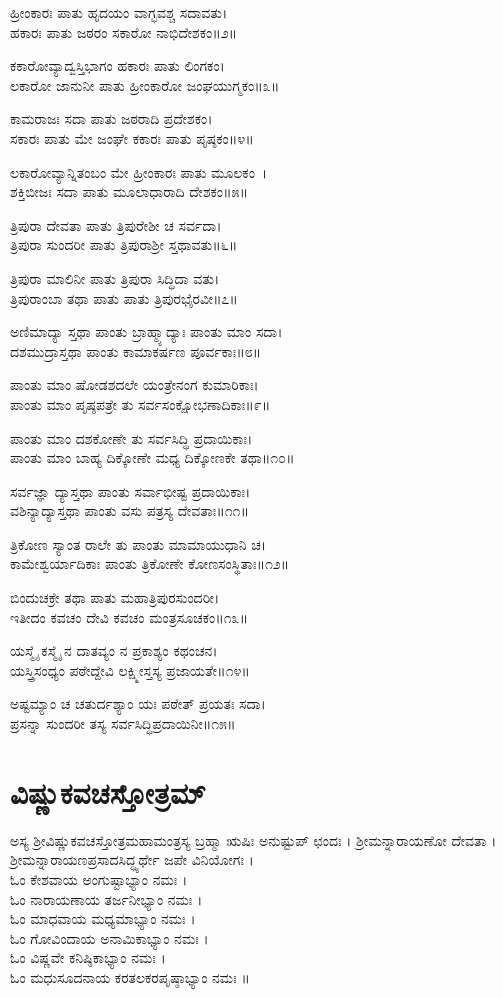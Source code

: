ಹ್ರೀಂಕಾರಃ ಪಾತು ಹೃದಯಂ ವಾಗ್ಭವಶ್ಚ ಸದಾವತು।\\
ಹಕಾರಃ ಪಾತು ಜಠರಂ ಸಕಾರೋ ನಾಭಿದೇಶಕಂ॥೨॥

ಕಕಾರೋವ್ಯಾದ್ವಸ್ತಿಭಾಗಂ ಹಕಾರಃ ಪಾತು ಲಿಂಗಕಂ।\\
ಲಕಾರೋ ಜಾನುನೀ ಪಾತು ಹ್ರೀಂಕಾರೋ ಜಂಘಯುಗ್ಮಕಂ॥೩॥

ಕಾಮರಾಜಃ ಸದಾ ಪಾತು ಜಠರಾದಿ ಪ್ರದೇಶಕಂ।\\
ಸಕಾರಃ ಪಾತು ಮೇ ಜಂಘೇ ಕಕಾರಃ ಪಾತು ಪೃಷ್ಠಕಂ॥೪॥

ಲಕಾರೋವ್ಯಾನ್ನಿತಂಬಂ ಮೇ ಹ್ರೀಂಕಾರಃ ಪಾತು ಮೂಲಕಂ~।\\
ಶಕ್ತಿಬೀಜಃ ಸದಾ ಪಾತು ಮೂಲಾಧಾರಾದಿ ದೇಶಕಂ॥೫॥

ತ್ರಿಪುರಾ ದೇವತಾ ಪಾತು ತ್ರಿಪುರೇಶೀ ಚ ಸರ್ವದಾ।\\
ತ್ರಿಪುರಾ ಸುಂದರೀ ಪಾತು ತ್ರಿಪುರಾಶ್ರೀ ಸ್ತಥಾವತು॥೬॥

ತ್ರಿಪುರಾ ಮಾಲಿನೀ ಪಾತು ತ್ರಿಪುರಾ ಸಿದ್ಧಿದಾ ವತು।\\
ತ್ರಿಪುರಾಂಬಾ ತಥಾ ಪಾತು ಪಾತು ತ್ರಿಪುರಭೈರವೀ॥೭॥

ಅಣಿಮಾದ್ಯಾ ಸ್ತಥಾ ಪಾಂತು ಬ್ರಾಹ್ಮ್ಯಾದ್ಯಾಃ ಪಾಂತು ಮಾಂ ಸದಾ।\\
ದಶಮುದ್ರಾಸ್ತಥಾ ಪಾಂತು ಕಾಮಾಕರ್ಷಣ ಪೂರ್ವಕಾಃ॥೮॥

ಪಾಂತು ಮಾಂ ಷೋಡಶದಲೇ ಯಂತ್ರೇನಂಗ ಕುಮಾರಿಕಾಃ।\\
ಪಾಂತು ಮಾಂ ಪೃಷ್ಠಪತ್ರೇ ತು ಸರ್ವಸಂಕ್ಷೋಭಣಾದಿಕಾಃ॥೯॥

ಪಾಂತು ಮಾಂ ದಶಕೋಣೇ ತು ಸರ್ವಸಿದ್ಧಿ ಪ್ರದಾಯಿಕಾಃ।\\
ಪಾಂತು ಮಾಂ ಬಾಹ್ಯ ದಿಕ್ಕೋಣೇ ಮಧ್ಯ ದಿಕ್ಕೋಣಕೇ ತಥಾ॥೧೦॥

ಸರ್ವಜ್ಞಾ ದ್ಯಾಸ್ತಥಾ ಪಾಂತು ಸರ್ವಾಭೀಷ್ಟ ಪ್ರದಾಯಿಕಾಃ।\\
ವಶಿನ್ಯಾದ್ಯಾಸ್ತಥಾ ಪಾಂತು ವಸು ಪತ್ರಸ್ಯ ದೇವತಾಃ॥೧೧॥

ತ್ರಿಕೋಣ ಸ್ಯಾಂತ ರಾಲೇ ತು ಪಾಂತು ಮಾಮಾಯುಧಾನಿ ಚ।\\
ಕಾಮೇಶ್ವರ್ಯಾದಿಕಾಃ ಪಾಂತು ತ್ರಿಕೋಣೇ ಕೋಣಸಂಸ್ಥಿತಾಃ॥೧೨॥

ಬಿಂದುಚಕ್ರೇ ತಥಾ ಪಾತು ಮಹಾತ್ರಿಪುರಸುಂದರೀ।\\
ಇತೀದಂ ಕವಚಂ ದೇವಿ ಕವಚಂ ಮಂತ್ರಸೂಚಕಂ॥೧೩॥

ಯಸ್ಮೈ ಕಸ್ಮೈ ನ ದಾತವ್ಯಂ ನ ಪ್ರಕಾಶ್ಯಂ ಕಥಂಚನ।\\
ಯಸ್ತ್ರಿಸಂಧ್ಯಂ ಪಠೇದ್ದೇವಿ ಲಕ್ಷ್ಮೀಸ್ತಸ್ಯ ಪ್ರಜಾಯತೇ॥೧೪॥

ಅಷ್ಟಮ್ಯಾಂ ಚ ಚತುರ್ದಶ್ಯಾಂ ಯಃ ಪಠೇತ್ ಪ್ರಯತಃ ಸದಾ।\\
ಪ್ರಸನ್ನಾ ಸುಂದರೀ ತಸ್ಯ ಸರ್ವಸಿದ್ಧಿಪ್ರದಾಯಿನೀ॥೧೫॥
\section{ವಿಷ್ಣುಕವಚಸ್ತೋತ್ರಮ್}
ಅಸ್ಯ ಶ್ರೀವಿಷ್ಣುಕವಚಸ್ತೋತ್ರಮಹಾಮಂತ್ರಸ್ಯ ಬ್ರಹ್ಮಾ ಋಷಿಃ ಅನುಷ್ಟುಪ್ ಛಂದಃ । ಶ್ರೀಮನ್ನಾರಾಯಣೋ ದೇವತಾ । ಶ್ರೀಮನ್ನಾರಾಯಣಪ್ರಸಾದಸಿದ್ಧ್ಯರ್ಥೇ ಜಪೇ ವಿನಿಯೋಗಃ ।\\
ಓಂ ಕೇಶವಾಯ ಅಂಗುಷ್ಟಾಭ್ಯಾಂ ನಮಃ ।\\
ಓಂ ನಾರಾಯಣಾಯ ತರ್ಜನೀಭ್ಯಾಂ ನಮಃ ।\\
ಓಂ ಮಾಧವಾಯ ಮಧ್ಯಮಾಭ್ಯಾಂ ನಮಃ ।\\
ಓಂ ಗೋವಿಂದಾಯ ಅನಾಮಿಕಾಭ್ಯಾಂ ನಮಃ ।\\
ಓಂ ವಿಷ್ಣವೇ ಕನಿಷ್ಠಿಕಾಭ್ಯಾಂ ನಮಃ ।\\
ಓಂ ಮಧುಸೂದನಾಯ ಕರತಲಕರಪೃಷ್ಠಾಭ್ಯಾಂ ನಮಃ ॥

